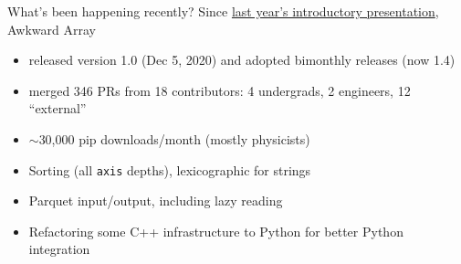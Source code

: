 \documentclass[aspectratio=169]{beamer}
\begin{document}
\begin{frame}{What's been happening recently?}
Since \href{https://youtu.be/WlnUF3LRBj4}{last year's introductory presentation}, Awkward Array
\begin{itemize}
\item released version 1.0 (Dec 5, 2020) and adopted bimonthly releases (now 1.4)
\item merged 346 PRs from 18 contributors: 4 undergrads, 2 engineers, 12 ``external''
\item $\sim$30,000 pip downloads/month (mostly physicists)
\end{itemize}
\begin{itemize}
\item Sorting (all \texttt{axis} depths), lexicographic for strings
\item Parquet input/output, including lazy reading
\item Refactoring some C++ infrastructure to Python for better Python integration
\end{itemize}

\end{frame}
\end{document}
